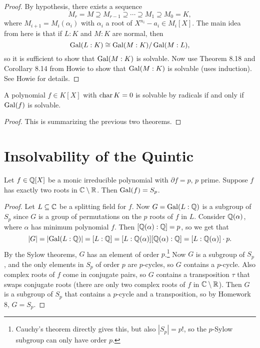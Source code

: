 \begin{proof}
  By hypothesis, there exists a sequence
  \[
    M_r = M \supseteq M_{r - 1} \supseteq \cdots \supseteq M_1 \supseteq M_0 = K,
  \]
  where $M_{i + 1} = M_i(\alpha_i)$ with $\alpha_i$
  a root of $X^{n_i} - a_i \in M_i[X]$.
  The main idea from here is that if $L : K$ and
  $M : K$ are normal, then
  \[
    \operatorname{Gal}(L : K) \cong \operatorname{Gal}(M : K) / \operatorname{Gal}(M : L),
  \]
  so it is sufficient to show that $\operatorname{Gal}(M : K)$ is
  solvable. Now use Theorem 8.18 and Corollary 8.14 from
  Howie to show that $\operatorname{Gal}(M : K)$ is solvable (uses
  induction). See Howie for details.
\end{proof}

\begin{theorem}
  A polynomial $f \in K[X]$ with $\operatorname{char} K = 0$ is
  solvable by radicals if and only if $\operatorname{Gal}(f)$ is
  solvable.
\end{theorem}

\begin{proof}
  This is summarizing the previous two theorems.
\end{proof}

\section{Insolvability of the Quintic}

\begin{theorem}
  Let $f \in \mathbb{Q}[X]$ be a monic irreducible polynomial
  with $\partial f = p$, $p$ prime. Suppose $f$ has
  exactly two roots in $\mathbb{C} \setminus \mathbb{R}$. Then
  $\operatorname{Gal}(f) = S_p$.
\end{theorem}

\begin{proof}
  Let $L \subseteq \mathbb{C}$ be a splitting field for $f$. Now
  $G = \operatorname{Gal}(L : \mathbb{Q})$ is a subgroup of $S_p$ since
  $G$ is a group of permutations on the $p$ roots of $f$
  in $L$. Consider $\mathbb{Q}(\alpha)$, where $\alpha$ has
  minimum polynomial $f$. Then $[\mathbb{Q}(\alpha) : \mathbb{Q}] = p$, so
  we get that
  \[
    |G| = |{\operatorname{Gal}(L : \mathbb{Q})}| = [L : \mathbb{Q}] = [L : \mathbb{Q}(\alpha)] [\mathbb{Q}(\alpha) : \mathbb{Q}]
    = [L : \mathbb{Q}(\alpha)] \cdot p.
  \]
  By the Sylow theorems, $G$ has an element of order $p$.\footnote{Cauchy's theorem directly gives this, but also $|S_p| = p!$, so the $p$-Sylow subgroup can only have order $p$.}
  Now $G$ is a subgroup of $S_p$, and the only elements
  in $S_p$ of order $p$ are $p$-cycles, so
  $G$ contains a $p$-cycle. Also complex roots of
  $f$ come in conjugate pairs, so $G$ contains a
  transposition $\tau$ that swaps conjugate roots (there
  are only two complex roots of $f$ in $\mathbb{C} \setminus \mathbb{R}$).
  Then $G$ is a subgroup of $S_p$ that contains a
  $p$-cycle and a transposition, so by Homework 8,
  $G = S_p$.
\end{proof}

